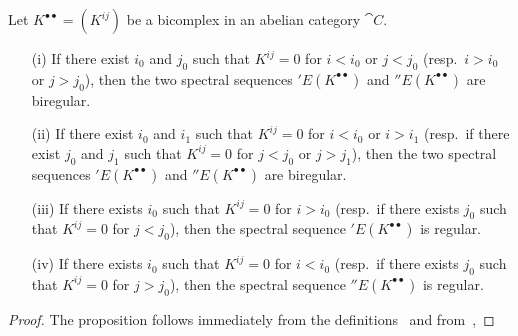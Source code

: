 \begin{proposition}[11.3.3]
\label{0.11.3.3}
Let $K^{\bullet\bullet}=(K^{ij})$ be a bicomplex in an abelian category $\cat{C}$.
\begin{enumerate}
  \item[{\rm(i)}] If there exist $i_0$ and $j_0$ such that $K^{ij}=0$ for $i<i_0$ or $j<j_0$ (resp.~$i>i_0$ or $j>j_0$), then the two spectral sequences $'E(K^{\bullet\bullet})$ and $''E(K^{\bullet\bullet})$ are biregular.
  \item[{\rm(ii)}] If there exist $i_0$ and $i_1$ such that $K^{ij}=0$ for $i<i_0$ or $i>i_1$ (resp.~if there exist $j_0$ and $j_1$ such that $K^{ij}=0$ for $j<j_0$ or $j>j_1$), then the two spectral sequences $'E(K^{\bullet\bullet})$ and $''E(K^{\bullet\bullet})$ are biregular.
  \item[{\rm(iii)}] If there exists $i_0$ such that $K^{ij}=0$ for $i>i_0$ (resp.~if there exists $j_0$ such that $K^{ij}=0$ for $j<j_0$), then the spectral sequence $'E(K^{\bullet\bullet})$ is regular.
  \item[{\rm(iv)}] If there exists $i_0$ such that $K^{ij}=0$ for $i<i_0$ (resp.~if there exists $j_0$ such that $K^{ij}=0$ for $j>j_0$), then the spectral sequence $''E(K^{\bullet\bullet})$ is regular.
\end{enumerate}
\end{proposition}

\begin{proof}
\label{proof-0.11.3.3}
The proposition follows immediately from the definitions~ and from~, 
\end{proof}


